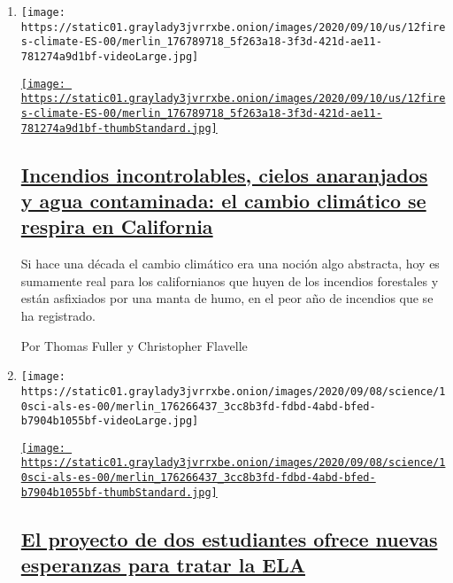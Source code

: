 \begin{enumerate}
\def\labelenumi{\arabic{enumi}.}
\item
  \texttt{[image: https://static01.graylady3jvrrxbe.onion/images/2020/09/10/us/12fires-climate-ES-00/merlin\_176789718\_5f263a18-3f3d-421d-ae11-781274a9d1bf-videoLarge.jpg]}

  \href{/es/2020/09/12/espanol/estados-unidos/cambio-climatico-incendios.html}{\texttt{[image: https://static01.graylady3jvrrxbe.onion/images/2020/09/10/us/12fires-climate-ES-00/merlin\_176789718\_5f263a18-3f3d-421d-ae11-781274a9d1bf-thumbStandard.jpg]}}

  \hypertarget{incendios-incontrolables-cielos-anaranjados-y-agua-contaminada-el-cambio-climuxe1tico-se-respira-en-california}{%
  \subsection{\texorpdfstring{\href{/es/2020/09/12/espanol/estados-unidos/cambio-climatico-incendios.html}{Incendios
  incontrolables, cielos anaranjados y agua contaminada: el cambio
  climático se respira en
  California}}{Incendios incontrolables, cielos anaranjados y agua contaminada: el cambio climático se respira en California}}\label{incendios-incontrolables-cielos-anaranjados-y-agua-contaminada-el-cambio-climuxe1tico-se-respira-en-california}}

  Si hace una década el cambio climático era una noción algo abstracta,
  hoy es sumamente real para los californianos que huyen de los
  incendios forestales y están asfixiados por una manta de humo, en el
  peor año de incendios que se ha registrado.

  Por Thomas Fuller y Christopher Flavelle
\item
  \texttt{[image: https://static01.graylady3jvrrxbe.onion/images/2020/09/08/science/10sci-als-es-00/merlin\_176266437\_3cc8b3fd-fdbd-4abd-bfed-b7904b1055bf-videoLarge.jpg]}

  \href{/es/2020/09/11/espanol/ciencia-y-tecnologia/ela-reto-hielo.html}{\texttt{[image: https://static01.graylady3jvrrxbe.onion/images/2020/09/08/science/10sci-als-es-00/merlin\_176266437\_3cc8b3fd-fdbd-4abd-bfed-b7904b1055bf-thumbStandard.jpg]}}

  \hypertarget{el-proyecto-de-dos-estudiantes-ofrece-nuevas-esperanzas-para-tratar-la-ela}{%
  \subsection{\texorpdfstring{\href{/es/2020/09/11/espanol/ciencia-y-tecnologia/ela-reto-hielo.html}{El
  proyecto de dos estudiantes ofrece nuevas esperanzas para tratar la
  ELA}}{El proyecto de dos estudiantes ofrece nuevas esperanzas para tratar la ELA}}\label{el-proyecto-de-dos-estudiantes-ofrece-nuevas-esperanzas-para-tratar-la-ela}}


\end{enumerate}
